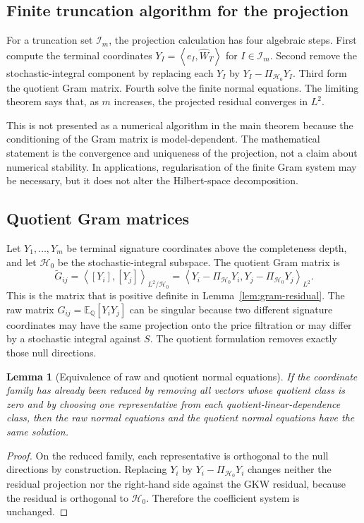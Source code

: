 \documentclass[11pt,oneside]{article}
\theoremstyle{plain}
\newtheorem{lemma}[theorem]{Lemma}
\theoremstyle{definition}
\theoremstyle{remark}
\newcommand{\E}{\mathbb{E}}
\newcommand{\Q}{\mathbb{Q}}
\newcommand{\cW}{\widehat W}
\newcommand{\inner}[2]{\left\langle #1,#2\right\rangle}
\begin{document}
\subsection*{Finite truncation algorithm for the projection}
For a truncation set $\mathcal I_m$, the projection calculation has four algebraic steps. First compute the terminal coordinates $Y_I=\inner{e_I}{\cW_T}$ for $I\in\mathcal I_m$. Second remove the stochastic-integral component by replacing each $Y_I$ by $Y_I-\Pi_{\mathcal H_0}Y_I$. Third form the quotient Gram matrix. Fourth solve the finite normal equations. The limiting theorem says that, as $m$ increases, the projected residual converges in $L^2$.

This is not presented as a numerical algorithm in the main theorem because the conditioning of the Gram matrix is model-dependent. The mathematical statement is the convergence and uniqueness of the projection, not a claim about numerical stability. In applications, regularisation of the finite Gram system may be necessary, but it does not alter the Hilbert-space decomposition.


\subsection*{Quotient Gram matrices}
Let $Y_1,\ldots,Y_m$ be terminal signature coordinates above the completeness depth, and let $\mathcal H_0$ be the stochastic-integral subspace. The quotient Gram matrix is
\[
\widetilde G_{ij}=\inner{[Y_i]}{[Y_j]}_{L^2/\mathcal H_0}
=\inner{Y_i-\Pi_{\mathcal H_0}Y_i}{Y_j-\Pi_{\mathcal H_0}Y_j}_{L^2}.
\]
This is the matrix that is positive definite in Lemma~\ref{lem:gram-residual}. The raw matrix $G_{ij}=\E_\Q[Y_iY_j]$ can be singular because two different signature coordinates may have the same projection onto the price filtration or may differ by a stochastic integral against $S$. The quotient formulation removes exactly those null directions.

\begin{lemma}[Equivalence of raw and quotient normal equations]
\label{lem:raw-quotient-normal-equations}
If the coordinate family has already been reduced by removing all vectors whose quotient class is zero and by choosing one representative from each quotient-linear-dependence class, then the raw normal equations and the quotient normal equations have the same solution.
\end{lemma}

\begin{proof}
On the reduced family, each representative is orthogonal to the null directions by construction. Replacing $Y_i$ by $Y_i-\Pi_{\mathcal H_0}Y_i$ changes neither the residual projection nor the right-hand side against the GKW residual, because the residual is orthogonal to $\mathcal H_0$. Therefore the coefficient system is unchanged.
\end{proof}
\end{document}
